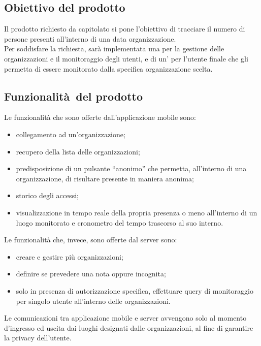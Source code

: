 \documentclass[../analisi-dei-requisiti.tex]{subfiles}
\begin{document}
\subsection{Obiettivo del prodotto}%
\label{sub:obiettivo_del_prodotto}
Il prodotto richiesto da capitolato si pone l'obiettivo di tracciare il numero di persone presenti all’interno di una data organizzazione.\\
Per soddisfare la richiesta, sarà implementata una  per la gestione delle organizzazioni e il monitoraggio degli utenti, e
di un' per l'utente finale che gli permetta di essere monitorato dalla specifica organizzazione scelta.


\subsection{Funzionalità del prodotto}%
\label{sub:funzionalita_del_prodotto}
Le funzionalità che sono offerte dall'applicazione mobile sono:
\begin{itemize}
  \item collegamento ad un’organizzazione;
  \item recupero della lista delle organizzazioni;
  \item predisposizione di un pulsante “anonimo” che permetta, all’interno di una organizzazione, di risultare presente in maniera anonima;
  \item storico degli accessi;
  \item visualizzazione in tempo reale della propria presenza o meno all’interno di un luogo monitorato e cronometro del tempo trascorso al suo interno.
\end{itemize}

Le funzionalità che, invece, sono offerte dal server sono:
\begin{itemize}
  \item creare e gestire più organizzazioni;
  \item definire se prevedere una  nota oppure incognita;
  \item solo in presenza di autorizzazione specifica, effettuare query di monitoraggio per singolo utente all’interno delle organizzazioni.
\end{itemize}
Le comunicazioni tra applicazione mobile e server avvengono solo al momento d'ingresso ed uscita dai luoghi designati dalle organizzazioni, al fine di garantire
la privacy dell'utente.
\end{document}
